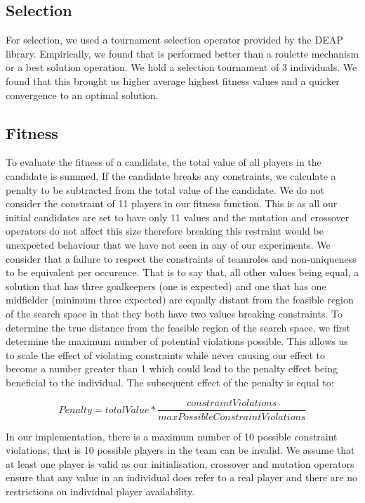 \documentclass[11pt,a4paper]{article}
\begin{document}
\subsection{Selection}
For selection, we used a tournament selection operator provided by the DEAP library. Empirically, we found that is performed better than a roulette mechanism or a best solution operation. We hold a selection tournament of 3 individuals. We found that this brought us higher average highest fitness values and a quicker convergence to an optimal solution.
\subsection{Fitness}
To evaluate the fitness of a candidate, the total value of all players in the candidate is summed. 
If the candidate breaks any constraints, we calculate a penalty to be subtracted from the total value of the candidate.
We do not consider the constraint of 11 players in our fitness function. This is as all our initial candidates are set to have only 11 values and the mutation and crossover operators do not affect this size therefore breaking this restraint would be unexpected behaviour that we have not seen in any of our experiments.
We consider that a failure to respect the constraints of teamroles and non-uniqueness to be equivalent per occurence. That is to say that, all other values being equal, a solution that has three goalkeepers (one is expected) and one that has one midfielder (minimum three expected) are equally distant from the feasible region of the search space in that they both have two values breaking constraints. To determine the true distance from the feasible region of the search space, we first determine the maximum number of potential violations possible. This allows us to scale the effect of violating constraints while never causing our effect to become a number greater than 1 which could lead to the penalty effect being beneficial to the individual. The subsequent effect of the penalty is equal to:

\begin{equation}
Penalty = totalValue * \frac{constraintViolations}{maxPossibleConstraintViolations}
\end{equation}

In our implementation, there is a maximum number of 10 possible constraint violations, that is 10 possible players in the team can be invalid. We assume that at least one player is valid as our initialisation, crossover and mutation operators ensure that any value in an individual does refer to a real player and there are no restrictions on individual player availability.
\end{document}
